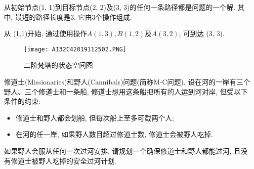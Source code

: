 从初始节点(1, 1)到目标节点(2, 2)及(3, 3)的任何一条路径都是问题的一个解. 其中, 最短的路径长度是3, 它由3个操作组成.
\begin{example}
从 (1,1)开始, 通过使用操作$A(1, 3),B(1, 2)$及$A(3, 2)$, 可到达 (3, 3).
\begin{figure}[H]
\centering
\texttt{[image: AI32C42019112502.PNG]}
\caption{二阶梵塔的状态空间图}
\label{AI32fig2019120223}
\end{figure}
\end{example}
\begin{example}
  修道士(Missionaries)和野人(Cannibals)问题(简称M-C问题). 设在河的一岸有三个野人、三个修道士和一条船, 修道士想用这条船把所有的人运到河对岸, 但受以下条件的约束:
\begin{itemize}
\item 修道士和野人都会划船, 但每次船上至多可载两个人;
\item 在河的任一岸, 如果野人数目超过修道士数, 修道士会被野人吃掉.
\end{itemize}
如果野人会服从任何一次过河安排, 请规划一个确保修道士和野人都能过河, 且没有修道士被野人吃掉的安全过河计划.
\end{example}
